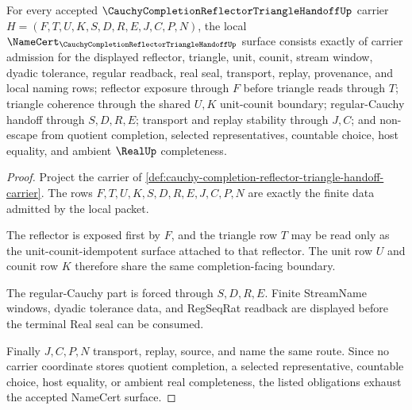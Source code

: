 \begin{theorem}
\label{thm:cauchy-completion-reflector-triangle-handoff-namecert-obligations}
For every accepted $\CauchyCompletionReflectorTriangleHandoffUp$ carrier $H=(F,T,U,K,S,D,R,E,J,C,P,N)$, the local $\NameCert_{\CauchyCompletionReflectorTriangleHandoffUp}$ surface consists exactly of carrier admission for the displayed reflector, triangle, unit, counit, stream window, dyadic tolerance, regular readback, real seal, transport, replay, provenance, and local naming rows; reflector exposure through $F$ before triangle reads through $T$; triangle coherence through the shared $U,K$ unit-counit boundary; regular-Cauchy handoff through $S,D,R,E$; transport and replay stability through $J,C$; and non-escape from quotient completion, selected representatives, countable choice, host equality, and ambient $\RealUp$ completeness.
\end{theorem}
\begin{proof}
Project the carrier of \autoref{def:cauchy-completion-reflector-triangle-handoff-carrier}. The rows $F,T,U,K,S,D,R,E,J,C,P,N$ are exactly the finite data admitted by the local packet.

The reflector is exposed first by $F$, and the triangle row $T$ may be read only as the unit-counit-idempotent surface attached to that reflector. The unit row $U$ and counit row $K$ therefore share the same completion-facing boundary.

The regular-Cauchy part is forced through $S,D,R,E$. Finite StreamName windows, dyadic tolerance data, and RegSeqRat readback are displayed before the terminal Real seal can be consumed.

Finally $J,C,P,N$ transport, replay, source, and name the same route. Since no carrier coordinate stores quotient completion, a selected representative, countable choice, host equality, or ambient real completeness, the listed obligations exhaust the accepted NameCert surface.
\end{proof}

